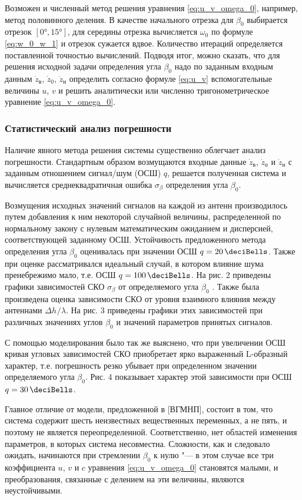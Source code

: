 \documentclass[../main.tex]{subfiles}
\begin{document}
Возможен и численный метод решения уравнения \eqref{eq:u_v_omega_0}, например, метод половинного деления. В качестве начального отрезка для $\beta_0$ выбирается отрезок $[\ang{0}, \ang{15}]$, для середины отрезка вычисляется  $\omega_0$ по формуле \eqref{eq:w_0_w_1} и отрезок сужается вдвое. Количество итераций определяется поставленной точностью вычислений. Подводя итог, можно сказать, что для решения исходной задачи определения угла $\beta_0$ надо по заданным входным данным $\dot{z}_\text{в}$, $\dot{z}_{0}$, $\dot{z}_\text{н}$ определить согласно формуле \eqref{eq:u_v} вспомогательные величины $u$, $v$ и решить аналитически или численно тригонометрическое уравнение \eqref{eq:u_v_omega_0}.

\subsubsection{Статистический анализ погрешности}
Наличие явного метода решения системы существенно облегчает анализ погрешности. Стандартным образом возмущаются входные данные $\dot{z}_\text{в}$, $\dot{z}_{о}$ и $\dot{z}_\text{н}$ с заданным отношением сигнал/шум (ОСШ) $q$, решается полученная система и вычисляется среднеквадратичная ошибка $\sigma_\beta$ определения угла $\beta_0$.

Возмущения исходных значений сигналов на каждой из антенн производилось путем добавления к ним некоторой случайной величины, распределенной по нормальному закону с нулевым математическим ожиданием и дисперсией, соответствующей заданному ОСШ. Устойчивость предложенного метода определения угла $\beta_0$ оценивалась при значении ОСШ $q = \SI{20}{\deciBells}$. Также при оценке рассматривался идеальный случай, в котором влияние шума пренебрежимо мало, т.е. ОСШ $q = \SI{100}{\deciBells}$. На рис. 2 приведены графики зависимостей СКО $\sigma_\beta$ от определяемого угла $\beta_0$
.
Также была произведена оценка зависимости СКО от уровня взаимного влияния между антеннами $\Delta h^{}/\lambda$. На рис. 3 приведены графики этих зависимостей при различных значениях углов $\beta_0$ и значений параметров принятых сигналов.

С помощью моделирования было так же выяснено, что при увеличении ОСШ кривая угловых зависимостей СКО приобретает ярко выраженный L-образный характер, т.е. погрешность резко убывает при определенном значении определяемого угла $\beta_0$. Рис. 4 показывает характер этой зависимости при ОСШ $q = \SI{30}{\deciBells}$.

Главное отличие от модели, предложенной в [ВГМНП], состоит в том, что система содержит шесть неизвестных вещественных переменных, а не пять, и поэтому не является переопределенной. Соответственно, нет областей изменения параметров, в которых система несовместна. Сложности, как и следовало ожидать, начинаются при стремлении $\beta_0$ к нулю "--- в этом случае все три коэффициента $u$, $v$ и $c$ уравнения \eqref{eq:u_v_omega_0} становятся малыми, и преобразования, связанные с делением на эти величины, являются неустойчивыми.
\end{document}
